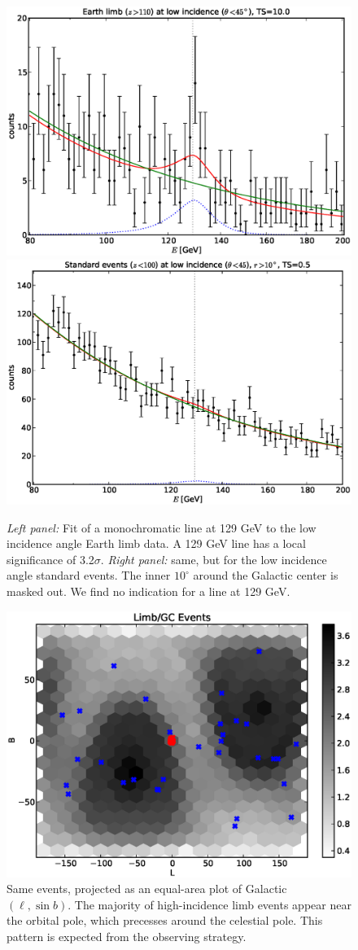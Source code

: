 \documentclass[aps,twocolumn,prd,superscriptaddress,showpacs,nofootinbib,fixfloat]{revtex4}
\begin{document}
\begin{figure}
  \centering
  \includegraphics[width=0.48\linewidth]{plots/albedo_line_thetaCut.eps}
  \includegraphics[width=0.48\linewidth]{plots/noalbedo_line_thetaCut.eps}
  \caption{\emph{Left panel:} Fit of a monochromatic line at 129 GeV to the
  low incidence angle Earth limb data. A 129 GeV line has a local significance of
  3.2$\sigma$.  \emph{Right panel:} same, but for the low incidence angle
  standard events. The inner $10^\circ$ around the Galactic center is masked
  out. We find no indication for a line at 129 GeV.}
  \label{fig:albedoline}
\end{figure}

\begin{figure}
  \centering
  \includegraphics[width=1.0\linewidth]{plots/limb_l_b.eps}
  \caption{Same events, projected as an equal-area plot of Galactic $(\ell,
  \sin b)$.  The majority of high-incidence limb events appear near the
  orbital pole, which precesses around the celestial pole.  This pattern is
  expected from the observing strategy.}
  \label{fig:l-b}
\end{figure}
\end{document}
